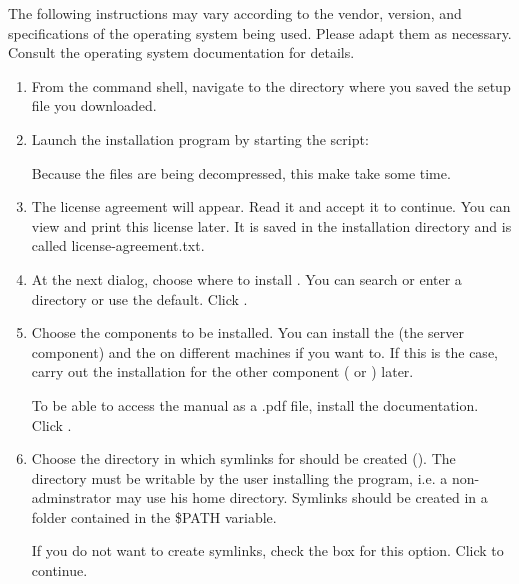 

The following instructions may vary according to the vendor, version, and specifications of the operating system being used. Please adapt them as necessary. Consult the operating system documentation for details.

\begin{enumerate}
\item From the command shell, navigate to the directory where you saved the setup file you downloaded. 
\item Launch the installation program by starting the script:\\
  
Because the files are being decompressed, this make take some time.  
  \item The license agreement will appear. Read it and accept it to continue.  
You can view and print this license later. It is saved in the \app{} installation directory and is called license-agreement.txt.   
\item At the next dialog, choose where to install \app{}. You can search or enter a directory or use the default. Click .

\item Choose the components to be installed.
You can install the \gdagent{} (the server component) and the \ite{} on different machines if you want to. If this is the case, carry out the installation for the other component (\ite{} or \gdagent{}) later. 

To be able to access the manual as a .pdf file, install the  \app{} documentation. Click .


\item Choose the directory in which symlinks for \app{} should be created (). The directory must be writable by the user installing the program, i.e. a non-adminstrator may use his home directory. Symlinks should be created in a folder contained in  the \$PATH variable.

If you do not want to create symlinks, check the box for this option. Click  to continue.  


\end{enumerate}
